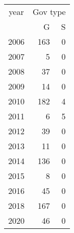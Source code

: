 \footnotesize\begin{tabular}[t]{lrr}
\toprule
\multicolumn{1}{c}{year} & \multicolumn{2}{c}{Gov type} \\
\cmidrule(l{3pt}r{3pt}){1-1} \cmidrule(l{3pt}r{3pt}){2-3}
  & G & S\\
\midrule
2006 & 163 & 0\\
2007 & 5 & 0\\
2008 & 37 & 0\\
2009 & 14 & 0\\
2010 & 182 & 4\\
2011 & 6 & 5\\
2012 & 39 & 0\\
2013 & 11 & 0\\
2014 & 136 & 0\\
2015 & 8 & 0\\
2016 & 45 & 0\\
2018 & 167 & 0\\
2020 & 46 & 0\\
\bottomrule
\end{tabular}
